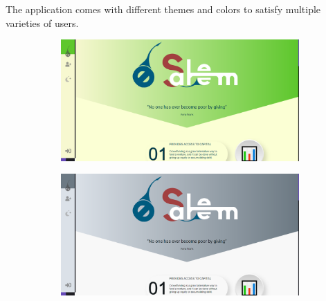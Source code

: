 The application comes with different themes and colors to satisfy multiple varieties of users.
\begin{figure}
      \centering
      \begin{subfigure}[H]{0.45\textwidth}
          \centering
          \includegraphics[width=\textwidth]{assets/screen-main-gre.png}
      \end{subfigure}
      \hfill
      \begin{subfigure}[H]{0.45\textwidth}
          \centering
          \includegraphics[width=\textwidth]{assets/screen-main-grey.png}
      \end{subfigure}
      
 \end{figure}

